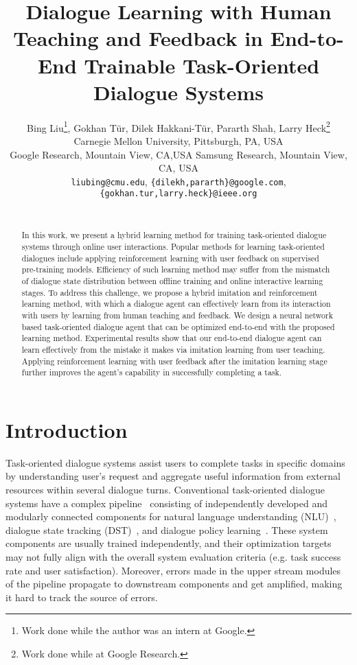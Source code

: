\documentclass[11pt,a4paper]{article}
\title{Dialogue Learning with Human Teaching and Feedback in End-to-End Trainable Task-Oriented Dialogue Systems}
\author{Bing Liu\thanks{\hspace{2mm}Work done while the author was an intern at Google.}, Gokhan T\"{u}r, Dilek Hakkani-T\"{u}r, Pararth Shah, Larry Heck\thanks{\hspace{2mm}Work done while at Google Research.} \\
  Carnegie Mellon University, Pittsburgh, PA, USA \\
  Google Research, Mountain View, CA,USA
  Samsung Research, Mountain View, CA, USA \\
  {\tt liubing@cmu.edu}, {\tt \{dilekh,pararth\}@google.com}, \\
  {\tt \{gokhan.tur,larry.heck\}@ieee.org}\\
   \\}
\date{}
\begin{document}
\maketitle
\begin{abstract}
    In this work, we present a hybrid learning method for training task-oriented dialogue systems through online user interactions. Popular methods for learning task-oriented dialogues include applying reinforcement learning with user feedback on supervised pre-training models. Efficiency of such learning method may suffer from the mismatch of dialogue state distribution between offline training and online interactive learning stages. To address this challenge, we propose a hybrid imitation and reinforcement learning method, with which a dialogue agent can effectively learn from its interaction with users by learning from human teaching and feedback. We design a neural network based task-oriented dialogue agent that can be optimized end-to-end with the proposed learning method. Experimental results show that our end-to-end dialogue agent can learn effectively from the mistake it makes via imitation learning from user teaching. Applying reinforcement learning with user feedback after the imitation learning stage further improves the agent's capability in successfully completing a task.
\end{abstract}

\section{Introduction}

\label{sec:intro}
    Task-oriented dialogue systems assist users to complete tasks in specific domains by understanding user's request and aggregate useful information from external resources within several dialogue turns. Conventional task-oriented dialogue systems have a complex pipeline~\cite{rudnicky1999creating,raux2005let,young2013pomdp} consisting of independently developed and modularly connected components for natural language understanding (NLU)~\cite{mesnil2015using,liu2016Joint,hakkani2016multi}, dialogue state tracking (DST)~\cite{henderson2014word,mrkvsic2016neural}, and dialogue policy learning~\cite{gasic2014gaussian,shah2016interactive,su2016line,su2017sample}. These system components are usually trained independently, and their optimization targets may not fully align with the overall system evaluation criteria (e.g. task success rate and user satisfaction). Moreover, errors made in the upper stream modules of the pipeline propagate to downstream components and get amplified, making it hard to track the source of errors. 
    
\end{document}
